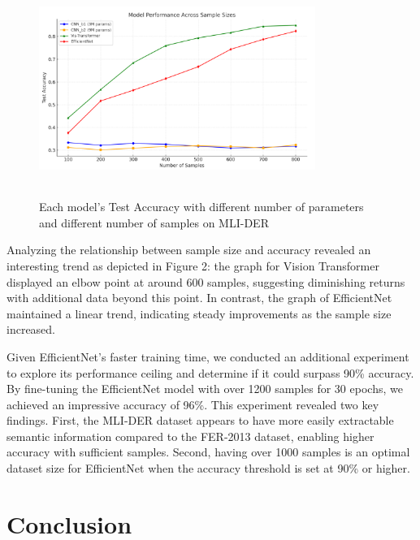 \documentclass[sigconf]{acmart}
\begin{document}
\begin{figure}[h]
\caption{Each model's Test Accuracy with different number of parameters and different number of samples on MLI-DER}
\centering
\includegraphics[width=9cm, height=7cm]{performance}
\end{figure}

Analyzing the relationship between sample size and accuracy revealed an interesting trend as depicted in Figure 2: the graph for Vision Transformer displayed an elbow point at around 600 samples, suggesting diminishing returns with additional data beyond this point. In contrast, the graph of EfficientNet maintained a linear trend, indicating steady improvements as the sample size increased.

Given EfficientNet's faster training time, we conducted an additional experiment to explore its performance ceiling and determine if it could surpass 90\% accuracy. By fine-tuning the EfficientNet model with over 1200 samples for 30 epochs, we achieved an impressive accuracy of 96\%. This experiment revealed two key findings. First, the MLI-DER dataset appears to have more easily extractable semantic information compared to the FER-2013 dataset, enabling higher accuracy with sufficient samples. Second, having over 1000 samples is an optimal dataset size for EfficientNet when the accuracy threshold is set at 90\% or higher.




\section{Conclusion}
\end{document}
